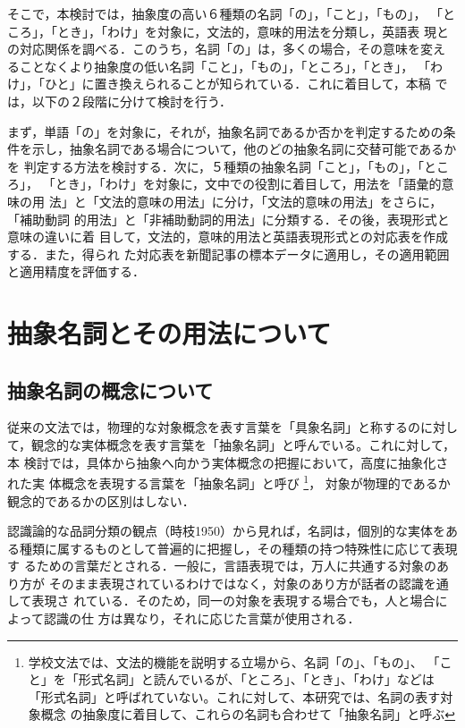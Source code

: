 そこで，本検討では，抽象度の高い６種類の名詞「の」，「こと」，「もの」，
「ところ」，「とき」，「わけ」を対象に，文法的，意味的用法を分類し，英語表
現との対応関係を調べる．このうち，名詞「の」は，多くの場合，その意味を変え
ることなくより抽象度の低い名詞「こと」，「もの」，「ところ」，「とき」，
「わけ」，「ひと」に置き換えられることが知られている．これに着目して，本稿
では，以下の２段階に分けて検討を行う．

まず，単語「の」を対象に，それが，抽象名詞であるか否かを判定するための条
件を示し，抽象名詞である場合について，他のどの抽象名詞に交替可能であるかを
判定する方法を検討する．次に，５種類の抽象名詞「こと」，「もの」，「ところ」，
「とき」，「わけ」を対象に，文中での役割に着目して，用法を「語彙的意味の用
法」と「文法的意味の用法」に分け，「文法的意味の用法」をさらに，「補助動詞
的用法」と「非補助動詞的用法」に分類する．その後，表現形式と意味の違いに着
目して，文法的，意味的用法と英語表現形式との対応表を作成する．また，得られ
た対応表を新聞記事の標本データに適用し，その適用範囲と適用精度を評価する．



\section{抽象名詞とその用法について}

\subsection{抽象名詞の概念について}

従来の文法では，物理的な対象概念を表す言葉を「具象名詞」と称するのに対し
て，観念的な実体概念を表す言葉を「抽象名詞」と呼んでいる。これに対して，本
検討では，具体から抽象へ向かう実体概念の把握において，高度に抽象化された実
体概念を表現する言葉を「抽象名詞」と呼び
\footnote{学校文法では、文法的機能を説明する立場から、名詞「の」、「もの」、
「こと」を「形式名詞」と読んでいるが、「ところ」、「とき」、「わけ」などは
「形式名詞」と呼ばれていない。これに対して、本研究では、名詞の表す対象概念
の抽象度に着目して、これらの名詞も合わせて「抽象名詞」と呼ぶ}，
対象が物理的であるか観念的であるかの区別はしない．

認識論的な品詞分類の観点（時枝1950）から見れば，名詞は，個別的な実体をあ
る種類に属するものとして普遍的に把握し，その種類の持つ特殊性に応じて表現す
るための言葉だとされる．一般に，言語表現では，万人に共通する対象のあり方が
そのまま表現されているわけではなく，対象のあり方が話者の認識を通して表現さ
れている．そのため，同一の対象を表現する場合でも，人と場合によって認識の仕
方は異なり，それに応じた言葉が使用される．

